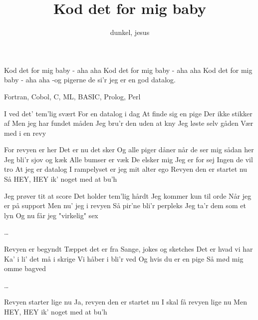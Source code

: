 \documentclass[danish]{article}
\title{Kod det for mig baby}
\author{dunkel, jesus}
\begin{document}

\begin{song}

 Kod det for mig baby - aha aha
Kod det for mig baby - aha aha
Kod det for mig baby - aha aha
-og pigerne de si'r jeg er en god datalog.

 Fortran, Cobol, C, ML, BASIC, Prolog, Perl

 I ved det' tem'lig svært
For en datalog i dag
At finde sig en pige
Der ikke stikker af
Men jeg har fundet måden
Jeg bru'r den uden at kny
Jeg løste selv gåden
Vær med i en revy

 For revyen er her
Det er nu det sker
Og alle piger dåner når de ser mig sådan her
Jeg bli'r sjov og kæk
Alle bumser er væk
De elsker mig
Jeg er for sej
Ingen de vil tro
At jeg er datalog
I rampelyset er jeg mit alter ego
Revyen den er startet nu
Så HEY, HEY ik' noget med at bu'h

 Jeg prøver tit at score
Det holder tem'lig hårdt
Jeg kommer kun til orde
Når jeg er på support
Men nu' jeg i revyen
Så pir'ne bli'r perpleks
Jeg ta'r dem som et lyn
Og nu får jeg "virkelig" sex

 \ldots{}

 Revyen er begyndt
Tæppet det er fra
Sange, jokes og sketches
Det er hvad vi har
Ka' i li' det må i skrige
Vi håber i bli'r ved
Og hvis du er en pige
Så mød mig omme bagved

 \ldots{}

Revyen starter lige nu
Ja, revyen den er startet nu
I skal få revyen lige nu
Men HEY, HEY ik' noget med at bu'h

\end{song}
\end{document}
